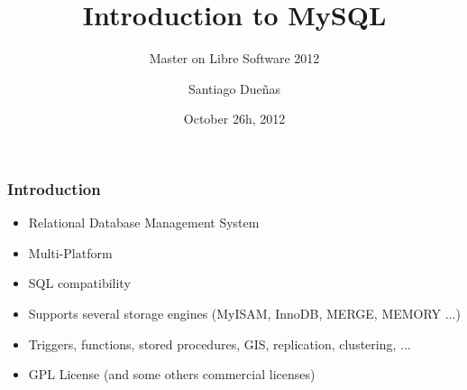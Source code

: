 \documentclass{beamer}
\begin{document}
\title{Introduction to MySQL}
\subtitle{Master on Libre Software 2012}
\author{Santiago Dueñas} 
\date{October 26h, 2012}




\begin{frame}
\frametitle{Introduction}

\begin{itemize}
\item Relational Database Management System
\item Multi-Platform
\item SQL compatibility
\item Supports several storage engines (MyISAM, InnoDB, MERGE, MEMORY ...)
\item Triggers, functions, stored procedures, GIS, replication, clustering, ...
\item GPL License (and some others commercial licenses)
\end{itemize}

\end{frame}

\end{document}
